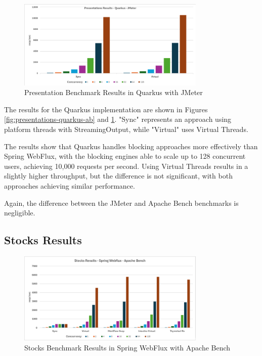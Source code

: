 \documentclass[../ppG48.tex]{subfiles}
\begin{document}
\begin{figure}[h]
     \centering 
     \includegraphics[width=0.8\textwidth]{../Graphs/presentations-quarkus-jmeter.png} 
     \caption{Presentation Benchmark Results in Quarkus with JMeter} 
     \label{fig:presentations-quarkus-jmeter} 
\end{figure}

The results for the Quarkus implementation are shown in Figures \ref{fig:presentations-quarkus-ab} and \ref{fig:presentations-quarkus-jmeter}. "Sync" represents an approach using platform threads with StreamingOutput, while "Virtual" uses Virtual Threads.

The results show that Quarkus handles blocking approaches more effectively than Spring WebFlux, with the blocking engines able to scale up to 128 concurrent users, achieving 10,000 requests per second. Using Virtual Threads results in a slightly higher throughput, but the difference is not significant, with both approaches achieving similar performance.

Again, the difference between the JMeter and Apache Bench benchmarks is negligible.

\subsection{Stocks Results}

\vspace{1cm}

\begin{figure}[h]
\centering 
\includegraphics[width=0.8\textwidth]{../Graphs/stocks-webflux-ab.png} 
\caption{Stocks Benchmark Results in Spring WebFlux with Apache Bench}
 \label{fig:stocks-webflux-ab}
\end{figure}
\end{document}
